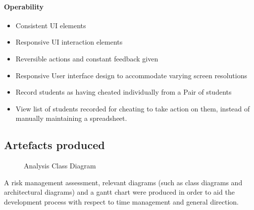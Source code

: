 \documentclass[11pt,a4paper]{article}
\begin{document}
\paragraph{Operability}
\begin{itemize}
    \item Consistent UI elements
    \item Responsive UI interaction elements
    \item Reversible actions and constant feedback given 
    \item Responsive User interface design to accommodate varying screen resolutions
    \item Record students as having cheated individually from a Pair of students
    \item View list of students recorded for cheating to take action on them, instead of manually maintaining a spreadsheet.
\end{itemize}

\subsection{Artefacts produced}

\begin{figure}[H]
  \caption{Analysis Class Diagram}
  \label{fig:analysisclass}
\end{figure}

A risk management assessment, relevant diagrams (such as class diagrams and
architectural diagrams) and a gantt chart were produced in order to aid the
development process with respect to time management and general direction. 
\end{document}
